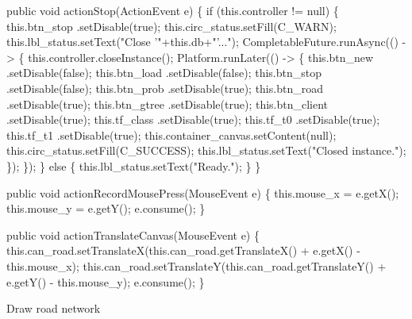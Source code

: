 \documentclass{article}
\def\nwendcode{\endtrivlist \endgroup}      %
\let\nwdocspar=\par
\begin{document}
\nwenddocs{}\endmoddef{}
public void actionStop(ActionEvent e) \{
  if (this.controller != null) \{
    this.btn_stop     .setDisable(true);
    this.circ_status.setFill(C_WARN);
    this.lbl_status.setText("Close '"+this.db+"'...");
    CompletableFuture.runAsync(() -> \{
      this.controller.closeInstance();
      Platform.runLater(() -> \{
        this.btn_new      .setDisable(false);
        this.btn_load     .setDisable(false);
        this.btn_stop     .setDisable(false);
        this.btn_prob     .setDisable(true);
        this.btn_road     .setDisable(true);
        this.btn_gtree    .setDisable(true);
        this.btn_client   .setDisable(true);
        this.tf_class     .setDisable(true);
        this.tf_t0        .setDisable(true);
        this.tf_t1        .setDisable(true);
        this.container_canvas.setContent(null);
        this.circ_status.setFill(C_SUCCESS);
        this.lbl_status.setText("Closed instance.");
      \});
    \});
  \} else \{
    this.lbl_status.setText("Ready.");
  \}
\}
\nwendcode{}\nwdocspar

\nwenddocs{}\endmoddef{}
public void actionRecordMousePress(MouseEvent e) \{
  this.mouse_x = e.getX();
  this.mouse_y = e.getY();
  e.consume();
\}
\nwendcode{}\nwdocspar

\nwenddocs{}\endmoddef{}
public void actionTranslateCanvas(MouseEvent e) \{
  this.can_road.setTranslateX(this.can_road.getTranslateX() + e.getX() - this.mouse_x);
  this.can_road.setTranslateY(this.can_road.getTranslateY() + e.getY() - this.mouse_y);
  e.consume();
\}
\nwendcode{}\nwdocspar

\nwenddocs{}\endmoddef{}
\LA{}Draw road network~{\nwtagstyle{}}\RA{}
\nwendcode{}\nwdocspar
\end{document}
